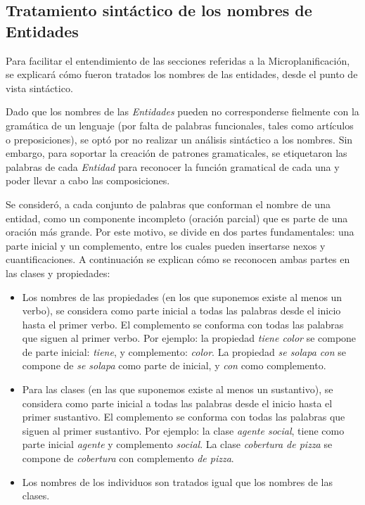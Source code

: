 \subsection{Tratamiento sintáctico de los nombres de Entidades}
Para facilitar el entendimiento de las secciones referidas a la Microplanificación, se explicará cómo fueron tratados los nombres de las entidades, desde el punto de vista sintáctico. 

Dado que los nombres de las\textit{ Entidades} pueden no corresponderse fielmente con la gramática de un lenguaje (por falta de palabras funcionales, tales como artículos o preposiciones), se optó por no realizar un análisis sintáctico a los nombres. Sin embargo, para soportar la creación de patrones gramaticales, se etiquetaron las palabras de cada \textit{Entidad }para reconocer la función gramatical de cada una y poder llevar a cabo las composiciones.

Se consideró, a cada conjunto de palabras que conforman el nombre de una entidad, como un componente incompleto (oración parcial) que es parte de una oración más grande. Por este motivo, se divide en dos partes fundamentales: una parte inicial y un complemento, entre los cuales pueden insertarse nexos y cuantificaciones. A continuación se explican cómo se reconocen ambas partes en las clases y propiedades:
\begin{itemize}
    \item Los nombres de las propiedades (en los que suponemos existe al menos un verbo), se considera como parte inicial a todas las palabras desde el inicio hasta el primer verbo. El complemento se conforma con todas las palabras que siguen al primer verbo. Por ejemplo: la propiedad \emph{tiene color} se compone de parte inicial: \emph{tiene}, y complemento: \emph{color}. La propiedad \emph{se solapa con} se compone de \emph{se solapa} como parte de inicial, y \emph{con} como complemento.
    \item Para las clases (en las que suponemos existe al menos un sustantivo), se considera como parte inicial a todas las palabras desde el inicio hasta el primer sustantivo. El complemento se conforma con todas las palabras que siguen al primer sustantivo. Por ejemplo: la clase \emph{agente social}, tiene como parte inicial \emph{agente} y complemento \emph{social}. La clase \emph{cobertura de pizza} se compone de \emph{cobertura} con complemento \emph{de pizza}.
    \item Los nombres de los individuos son tratados igual que los nombres de las clases.
\end{itemize}


